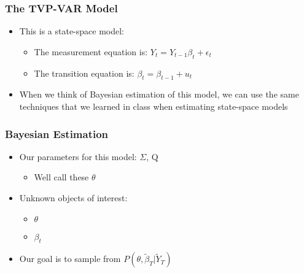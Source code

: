 \scshape\documentclass[xcolor=svgnames]{beamer}
\begin{document}
\begin{frame}
\frametitle{The TVP-VAR Model}
\begin{itemize}
	\item  This is a state-space model:
	\begin{itemize}
		\item  The measurement equation is: $ Y_t =  Y_{t-1} \beta_t + \epsilon_t $
		\item  The transition equation is: $ \beta_t = \beta_{t-1} + u_t $
	\end{itemize}
	\vspace{0.1 in}
	\item  When we think of Bayesian estimation of this model, we can use the same techniques that we learned in class when estimating state-space models
\end{itemize}
\end{frame}

\begin{frame}
\frametitle{Bayesian Estimation}
\begin{itemize}
	\item  Our parameters for this model: $\Sigma$, Q
	\begin{itemize}
		\item  Well call these $\theta$
	\end{itemize}
	\vspace{0.1 in}
	\item Unknown objects of interest:
	\begin{itemize}
		\item  $\theta$
		\item  $\beta_t$
	\end{itemize}
	\vspace{0.1 in}
	\item Our goal is to sample from $P(\theta,\tilde{\beta}_T|\tilde{Y}_T)$
\end{itemize}
\end{frame}
\end{document}
